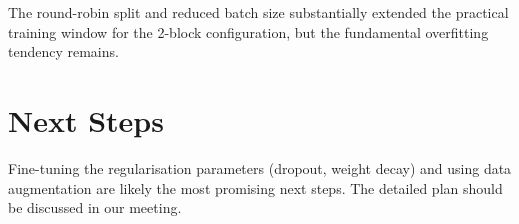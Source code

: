 \documentclass[9pt,a4paper,twocolumn,twoside]{tau-class/tau}
\begin{document}
The round-robin split and reduced batch size substantially extended the practical training window for the 2-block configuration, but the fundamental overfitting tendency remains. 

\section{Next Steps}

Fine-tuning the regularisation parameters (dropout, weight decay) and using data augmentation are likely the most promising next steps. The detailed plan should be discussed in our meeting.
\end{document}
